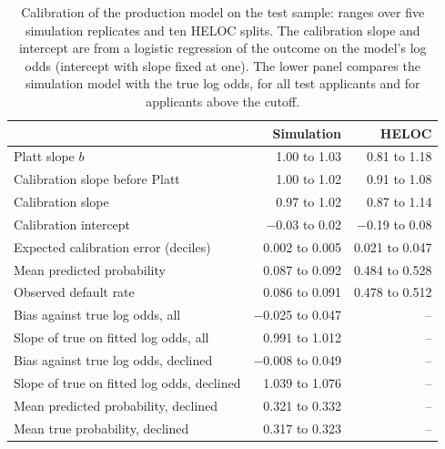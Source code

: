 \begin{table}[t]\centering\small
\caption{Calibration of the production model on the test sample: ranges over five simulation replicates and ten HELOC splits. The calibration slope and intercept are from a logistic regression of the outcome on the model's log odds (intercept with slope fixed at one). The lower panel compares the simulation model with the true log odds, for all test applicants and for applicants above the cutoff.}
\label{tab:calibration}
\begin{tabular}{@{}lrr@{}}\toprule
& Simulation & HELOC\\\midrule
Platt slope $b$ & 1.00 to 1.03 & 0.81 to 1.18\\
Calibration slope before Platt & 1.00 to 1.02 & 0.91 to 1.08\\
Calibration slope & 0.97 to 1.02 & 0.87 to 1.14\\
Calibration intercept & $-$0.03 to 0.02 & $-$0.19 to 0.08\\
Expected calibration error (deciles) & 0.002 to 0.005 & 0.021 to 0.047\\
Mean predicted probability & 0.087 to 0.092 & 0.484 to 0.528\\
Observed default rate & 0.086 to 0.091 & 0.478 to 0.512\\
\midrule
Bias against true log odds, all & $-$0.025 to 0.047 & --\\
Slope of true on fitted log odds, all & 0.991 to 1.012 & --\\
Bias against true log odds, declined & $-$0.008 to 0.049 & --\\
Slope of true on fitted log odds, declined & 1.039 to 1.076 & --\\
Mean predicted probability, declined & 0.321 to 0.332 & --\\
Mean true probability, declined & 0.317 to 0.323 & --\\
\bottomrule\end{tabular}
\end{table}
